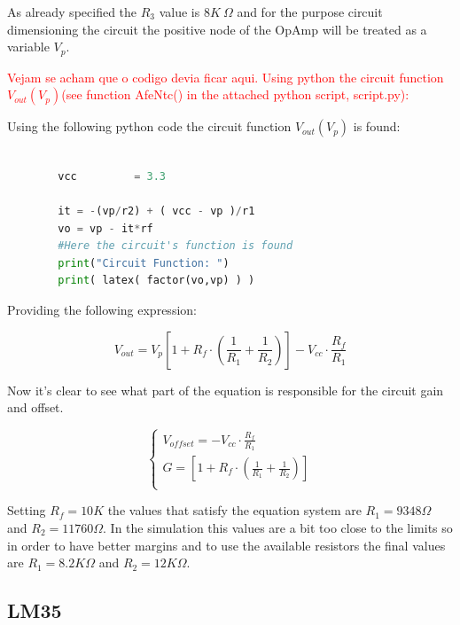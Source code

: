 \documentclass[12pt]{article}
\begin{document}
    As already specified the $R_3$ value is $8K~\Omega$ and for the purpose circuit dimensioning the circuit 
    the positive node of the OpAmp will be treated as a variable $V_p$.

    \textcolor{red}{ Vejam se acham que o codigo devia ficar aqui.       Using python the circuit function $V_{out}(V_p)$(see function AfeNtc() in the attached python script, script.py): }

    Using the following python code the circuit function $V_{out}(V_p)$ is found:
       
    \begin{lstlisting}[language=Python]
        
        vcc         = 3.3
    
        it = -(vp/r2) + ( vcc - vp )/r1
        vo = vp - it*rf
        #Here the circuit's function is found
        print("Circuit Function: ")
        print( latex( factor(vo,vp) ) )

    \end{lstlisting}
    
    Providing the following expression:

    \begin{equation}
        V_{out} = V_p\left[ 1 + R_f\cdot\left(\frac{1}{R_1} + \frac{1}{R_2}\right) \right] - V_{cc}\cdot\frac{R_f}{R_1}
    \end{equation}

    Now it's clear to see what part of the equation is responsible for the circuit gain and offset.
    
    \begin{equation}
        \begin{cases}
            V_{offset} = - V_{cc}\cdot\frac{R_f}{R_1}\\
            G = \left[ 1 + R_f\cdot\left(\frac{1}{R_1} + \frac{1}{R_2}\right) \right]\\
        \end{cases}
    \end{equation}

    Setting $R_f = 10K$ the values that satisfy the equation system are $R_1 = 9348 \Omega$ and $R_2 = 11760 \Omega$.
    In the simulation this values are a bit too close to the limits so in order to have better margins and to use the available resistors
    the final values are  $R_1 = 8.2K \Omega$ and $R_2 = 12K \Omega$.

\subsection{LM35}
\end{document}
